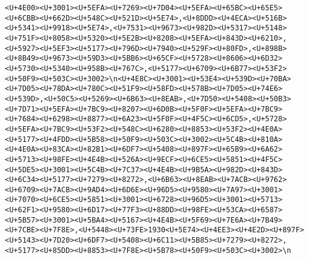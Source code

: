 \documentclass[
]{article}
\begin{document}
\begin{verbatim}
<U+4E00><U+3001><U+5EFA><U+7269><U+7D04><U+5EFA><U+65BC><U+65E5><U+6CBB><U+662D><U+548C><U+521D><U+5E74>,<U+8DDD><U+4ECA><U+516B><U+5341><U+9918><U+5E74>,<U+7531><U+9673><U+982D><U+5317><U+5148><U+751F><U+8058><U+5320><U+5E2B><U+8208><U+5EFA><U+843D><U+6210>,<U+5927><U+5EF3><U+5177><U+796D><U+7940><U+529F><U+80FD>,<U+898B><U+8B49><U+9673><U+59D3><U+5BB6><U+65CF><U+5728><U+8606><U+6D32><U+5730><U+5340><U+958B><U+767C>,<U+5177><U+6709><U+6B77><U+53F2><U+50F9><U+503C><U+3002>\n<U+4E8C><U+3001><U+53E4><U+539D><U+70BA><U+7D05><U+78DA><U+780C><U+51F9><U+58FD><U+578B><U+7D05><U+74E6><U+539D>,<U+50C5><U+5269><U+6B63><U+8EAB>,<U+7D50><U+5408><U+50B3><U+7D71><U+5EFA><U+7BC9><U+8207><U+6D0B><U+5F0F><U+5EFA><U+7BC9><U+7684><U+6298><U+8877><U+6A23><U+5F0F><U+4F5C><U+6CD5>,<U+5728><U+5EFA><U+7BC9><U+53F2><U+548C><U+6280><U+8853><U+53F2><U+4E0A><U+5177><U+4FDD><U+5B58><U+50F9><U+503C><U+3002><U+5C4B><U+810A><U+4E0A><U+83CA><U+82B1><U+6DF7><U+5408><U+897F><U+65B9><U+6A62><U+5713><U+98FE><U+4E4B><U+526A><U+9ECF><U+6CE5><U+5851><U+4F5C><U+5DE5><U+3001><U+5C4B><U+7C37><U+4E4B><U+9B5A><U+982D><U+843D><U+6C34><U+5177><U+7279><U+8272>,<U+6B63><U+8EAB><U+7ACB><U+9762><U+6709><U+7ACB><U+9AD4><U+6D6E><U+96D5><U+9580><U+7A97><U+3001><U+7070><U+6CE5><U+5851><U+3001><U+6728><U+96D5><U+3001><U+5713><U+62F1><U+9580><U+6D17><U+77F3><U+88DD><U+98FE><U+53CA><U+6587><U+5B57><U+3001><U+5BA4><U+5167><U+4E4B><U+5F69><U+7E6A><U+7B49><U+7CBE><U+7F8E>,<U+5448><U+73FE>1930<U+5E74><U+4EE3><U+4E2D><U+897F><U+5143><U+7D20><U+6DF7><U+5408><U+6C11><U+5B85><U+7279><U+8272>,<U+5177><U+85DD><U+8853><U+7F8E><U+5B78><U+50F9><U+503C><U+3002>\n

\end{verbatim}
\end{document}
